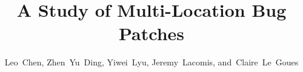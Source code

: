 \documentclass[10pt,journal,compsoc]{IEEEtran}
\begin{document}
\title{A Study of Multi-Location Bug Patches}

\author{Leo~Chen, Zhen~Yu~Ding, Yiwei~Lyu, Jeremy~Lacomis, and~Claire~Le~Goues}



% 
\end{document}
